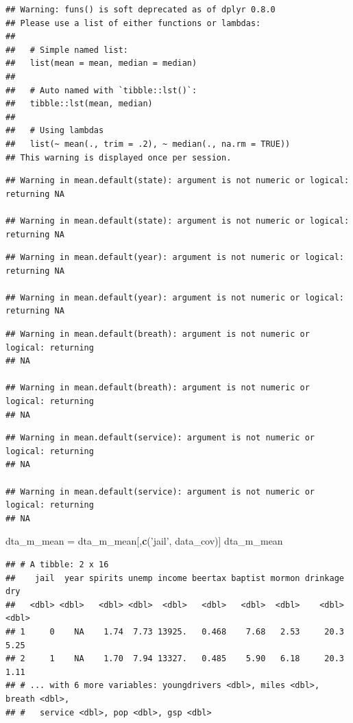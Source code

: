 \documentclass[]{article}
\newenvironment{Shaded}{\begin{snugshade}}{\end{snugshade}}
\newcommand{\KeywordTok}[1]{\textcolor[rgb]{0.13,0.29,0.53}{\textbf{#1}}}
\newcommand{\NormalTok}[1]{#1}
\newcommand{\StringTok}[1]{\textcolor[rgb]{0.31,0.60,0.02}{#1}}
\begin{document}
\begin{verbatim}
## Warning: funs() is soft deprecated as of dplyr 0.8.0
## Please use a list of either functions or lambdas: 
## 
##   # Simple named list: 
##   list(mean = mean, median = median)
## 
##   # Auto named with `tibble::lst()`: 
##   tibble::lst(mean, median)
## 
##   # Using lambdas
##   list(~ mean(., trim = .2), ~ median(., na.rm = TRUE))
## This warning is displayed once per session.
\end{verbatim}

\begin{verbatim}
## Warning in mean.default(state): argument is not numeric or logical: returning NA

## Warning in mean.default(state): argument is not numeric or logical: returning NA
\end{verbatim}

\begin{verbatim}
## Warning in mean.default(year): argument is not numeric or logical: returning NA

## Warning in mean.default(year): argument is not numeric or logical: returning NA
\end{verbatim}

\begin{verbatim}
## Warning in mean.default(breath): argument is not numeric or logical: returning
## NA

## Warning in mean.default(breath): argument is not numeric or logical: returning
## NA
\end{verbatim}

\begin{verbatim}
## Warning in mean.default(service): argument is not numeric or logical: returning
## NA

## Warning in mean.default(service): argument is not numeric or logical: returning
## NA
\end{verbatim}

\begin{Shaded}
\begin{Highlighting}[]
\NormalTok{dta_m_mean =}\StringTok{ }\NormalTok{dta_m_mean[,}\KeywordTok{c}\NormalTok{(}\StringTok{'jail'}\NormalTok{, data_cov)]}
\NormalTok{dta_m_mean}
\end{Highlighting}
\end{Shaded}

\begin{verbatim}
## # A tibble: 2 x 16
##    jail  year spirits unemp income beertax baptist mormon drinkage   dry
##   <dbl> <dbl>   <dbl> <dbl>  <dbl>   <dbl>   <dbl>  <dbl>    <dbl> <dbl>
## 1     0    NA    1.74  7.73 13925.   0.468    7.68   2.53     20.3  5.25
## 2     1    NA    1.70  7.94 13327.   0.485    5.90   6.18     20.3  1.11
## # ... with 6 more variables: youngdrivers <dbl>, miles <dbl>, breath <dbl>,
## #   service <dbl>, pop <dbl>, gsp <dbl>
\end{verbatim}
\end{document}
